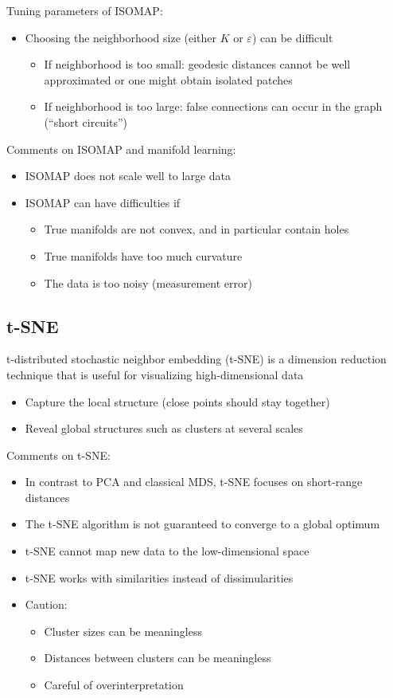 \documentclass[a4paper]{article}
\begin{document}
Tuning parameters of ISOMAP:
\begin{itemize}
    \item Choosing the neighborhood size (either $K$ or $\varepsilon$) can be difficult
    \begin{itemize}
        \item If neighborhood is too small: geodesic distances cannot be well approximated or one might obtain isolated patches
        \item If neighborhood is too large: false connections can occur in the graph (``short circuits'')
    \end{itemize}
\end{itemize}

Comments on ISOMAP and manifold learning:
\begin{itemize}
    \item ISOMAP does not scale well to large data
    \item ISOMAP can have difficulties if
    \begin{itemize}
        \item True manifolds are not convex, and in particular contain holes
        \item True manifolds have too much curvature
        \item The data is too noisy (measurement error)
    \end{itemize}
\end{itemize}

\subsection{t-SNE}

t-distributed stochastic neighbor embedding (t-SNE) is a dimension reduction technique that is useful for visualizing high-dimensional data
\begin{itemize}
    \item Capture the local structure (close points should stay together)
    \item Reveal global structures such as clusters at several scales
\end{itemize}

Comments on t-SNE:
\begin{itemize}
    \item In contrast to PCA and classical MDS, t-SNE focuses on short-range distances
    \item The t-SNE algorithm is not guaranteed to converge to a global optimum
    \item t-SNE cannot map new data to the low-dimensional space
    \item t-SNE works with similarities instead of dissimularities
    \item Caution:
    \begin{itemize}
        \item Cluster sizes can be meaningless
        \item Distances between clusters can be meaningless
        \item Careful of overinterpretation
    \end{itemize}
\end{itemize}
\end{document}
